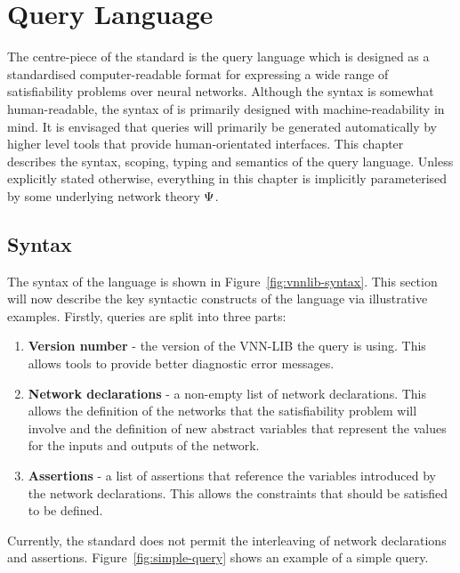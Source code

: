 \chapter{Query Language}
\label{sec:specification_language}

The centre-piece of the \vnnlib{} standard is the \vnnlib{} query language which is designed as a standardised computer-readable format for expressing a wide range of satisfiability problems over neural networks.
Although the syntax is somewhat human-readable, the syntax of \vnnlib{} is primarily designed with machine-readability in mind. 
It is envisaged that \vnnlib{} queries will primarily be generated automatically by higher level tools that provide human-orientated interfaces.
This chapter describes the syntax, scoping, typing and semantics of the query language. Unless explicitly stated otherwise, everything in this chapter is implicitly parameterised by some underlying network theory $\Psi$.

\section{Syntax}
\label{sec:syntax}

The syntax of the language is shown in Figure~\ref{fig:vnnlib-syntax}.  This section will now describe the key syntactic constructs of the language via illustrative examples. Firstly, \vnnlib{} queries are split into three parts: 
\begin{enumerate}
\item \textbf{Version number} - the version of the VNN-LIB the query is using. This allows tools to provide better diagnostic error messages.
\item \textbf{Network declarations} - a non-empty list of network declarations. This allows the definition of the networks that the satisfiability problem will involve and the definition of new abstract variables that represent the values for the inputs and outputs of the network.
\item \textbf{Assertions} - a list of assertions that reference the variables introduced by the network declarations. This allows the constraints that should be satisfied to be defined.
\end{enumerate}
Currently, the standard does not permit the interleaving of network declarations and assertions. Figure~\ref{fig:simple-query} shows an example of a simple query.

